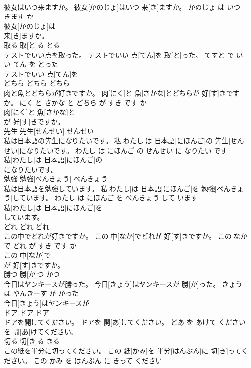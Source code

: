 \documentclass[8pt]{extreport}
\begin{document}
\begin{CJK}{UTF8}{min}
\\	彼女はいつ来ますか。	彼女[かのじょ]はいつ 来[き]ますか。	かのじょ は いつ きます か	
\\	彼女[かのじょ]は
\\	来[き]ますか。			
\\	取る	取[と]る	とる	
\\	テストでいい点を取った。	テストでいい 点[てん]を 取[と]った。	てすと で いい てん を とった	
\\	テストでいい 点[てん]を
\\	どちら	どちら	どちら	
\\	肉と魚とどちらが好きですか。	肉[にく]と 魚[さかな]とどちらが 好[す]きですか。	にく と さかな と どちら が すき です か	
\\	肉[にく]と 魚[さかな]と
\\	が 好[す]きですか。			
\\	先生	先生[せんせい]	せんせい	
\\	私は日本語の先生になりたいです。	私[わたし]は 日本語[にほんご]の 先生[せんせい]になりたいです。	わたし は にほんご の せんせい に なりたい です	
\\	私[わたし]は 日本語[にほんご]の
\\	になりたいです。			
\\	勉強	勉強[べんきょう]	べんきょう	
\\	私は日本語を勉強しています。	私[わたし]は 日本語[にほんご]を 勉強[べんきょう]しています。	わたし は にほんご を べんきょう して います	
\\	私[わたし]は 日本語[にほんご]を
\\	しています。			
\\	どれ	どれ	どれ	
\\	この中でどれが好きですか。	この 中[なか]でどれが 好[す]きですか。	この なか で どれ が すき です か	
\\	この 中[なか]で
\\	が 好[す]きですか。			
\\	勝つ	勝[か]つ	かつ	
\\	今日はヤンキースが勝った。	今日[きょう]はヤンキースが 勝[か]った。	きょう は やんきーす が かった	
\\	今日[きょう]はヤンキースが
\\	ドア	ドア	ドア	
\\	ドアを開けてください。	ドアを 開[あ]けてください。	どあ を あけて ください	
\\	を 開[あ]けてください。			
\\	切る	切[き]る	きる	
\\	この紙を半分に切ってください。	この 紙[かみ]を 半分[はんぶん]に 切[き]ってください。	この かみ を はんぶん に きって ください	

\end{CJK}
\end{document}
